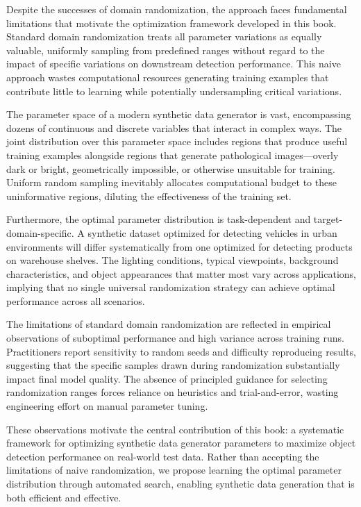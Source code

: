 Despite the successes of domain randomization, the approach faces fundamental limitations that motivate the optimization framework developed in this book. Standard domain randomization treats all parameter variations as equally valuable, uniformly sampling from predefined ranges without regard to the impact of specific variations on downstream detection performance. This naive approach wastes computational resources generating training examples that contribute little to learning while potentially undersampling critical variations.

The parameter space of a modern synthetic data generator is vast, encompassing dozens of continuous and discrete variables that interact in complex ways. The joint distribution over this parameter space includes regions that produce useful training examples alongside regions that generate pathological images---overly dark or bright, geometrically impossible, or otherwise unsuitable for training. Uniform random sampling inevitably allocates computational budget to these uninformative regions, diluting the effectiveness of the training set.

Furthermore, the optimal parameter distribution is task-dependent and target-domain-specific. A synthetic dataset optimized for detecting vehicles in urban environments will differ systematically from one optimized for detecting products on warehouse shelves. The lighting conditions, typical viewpoints, background characteristics, and object appearances that matter most vary across applications, implying that no single universal randomization strategy can achieve optimal performance across all scenarios.

The limitations of standard domain randomization are reflected in empirical observations of suboptimal performance and high variance across training runs. Practitioners report sensitivity to random seeds and difficulty reproducing results, suggesting that the specific samples drawn during randomization substantially impact final model quality. The absence of principled guidance for selecting randomization ranges forces reliance on heuristics and trial-and-error, wasting engineering effort on manual parameter tuning.

These observations motivate the central contribution of this book: a systematic framework for optimizing synthetic data generator parameters to maximize object detection performance on real-world test data. Rather than accepting the limitations of naive randomization, we propose learning the optimal parameter distribution through automated search, enabling synthetic data generation that is both efficient and effective.

